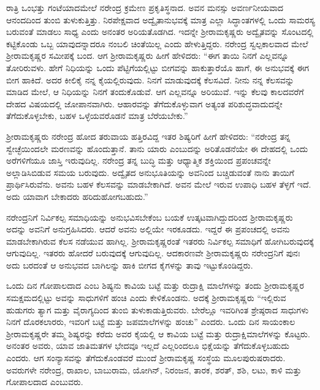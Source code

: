 ರಾತ್ರಿ ಒಂಭತ್ತು ಗಂಟೆಯಾದಮೇಲೆ ನರೇಂದ್ರ ಕ್ರಮೇಣ ಪ್ರಕೃತಿಸ್ಥನಾದ. ಅವನ ಮನಸ್ಸು ಅವರ್ಣನೀಯವಾದ ಆನಂದದಿಂದ ತುಂಬಿ ತುಳುಕುತ್ತಿತ್ತು. ನಿರಪೇಕ್ಷವಾದ ಅದ್ವೈತಾನುಭವಕ್ಕೆ ಮಾತ್ರ ಎಲ್ಲಾ ಸಿದ್ಧಾಂತಗಳಲ್ಲಿ ಒಂದು ಸಾಮರಸ್ಯ ಬರುವಂತೆ ಮಾಡಲು ಸಾಧ್ಯ ಎಂದು ಅನಂತರ ಅರಿಯತೊಡಗಿದ. ಇದನ್ನೇ ಶ‍್ರೀರಾಮಕೃಷ್ಣರು ಅದ್ವೈತವನ್ನು ಸೊಂಟದಲ್ಲಿ ಕಟ್ಟಿಕೊಂಡು ಒಬ್ಬ ಯಾವುದನ್ನಾದರೂ ನಂಬಲಿ ಚಿಂತೆಯಿಲ್ಲ ಎಂದು ಹೇಳುತ್ತಿದ್ದರು. ನರೇಂದ್ರ ಸ್ವಲ್ಪಕಾಲವಾದ ಮೇಲೆ ಶ‍್ರೀರಾಮಕೃಷ್ಣರ ಸಮೀಪಕ್ಕೆ ಬಂದ. ಆಗ ಶ‍್ರೀರಾಮಕೃಷ್ಣರು ಹೀಗೆ ಹೇಳಿದರು: “ಈಗ ತಾಯಿ ನಿನಗೆ ಎಲ್ಲವನ್ನೂ ತೋರಿರುವಳು. ಹೇಗೆ ನಿಧಿಯನ್ನು ಒಂದು ಪೆಟ್ಟಿಗೆಯಲ್ಲಿಟ್ಟು ಬೀಗವನ್ನು ಹಾಕುತ್ತಾರೆಯೊ ಹಾಗೆ, ಈ ಅನುಭವಕ್ಕೆ ಈಗ ಬೀಗ ಹಾಕಿದೆ. ಅದರ ಕೀಲಿಕೈ ನನ್ನ ಕೈಯಲ್ಲಿರುವುದು. ನಿನಗೆ ಮಾಡುವುದಕ್ಕೆ ಕೆಲಸವಿದೆ. ನೀನು ನನ್ನ ಕೆಲಸವನ್ನು ಮಾಡಿದ ಮೇಲೆ, ಆ ನಿಧಿಯನ್ನು ನಿನಗೆ ತಂದುಕೊಡುವೆ. ಆಗ ಎಲ್ಲವನ್ನೂ ಅರಿಯುವೆ. ಇನ್ನು ಕೆಲವು ಕಾಲದವರೆಗೆ ದೇಹದ ವಿಷಯದಲ್ಲಿ ಜೋಪಾನವಾಗಿರು. ಆಹಾರವನ್ನು ತೆಗೆದುಕೊಳ್ಳುವಾಗ ಅತ್ಯಂತ ಪರಿಶುದ್ಧವಾದುದನ್ನೇ ತೆಗೆದುಕೊಳ್ಳಬೇಕು, ಬಹಳ ಒಳ್ಳೆಯವರೊಡನೆ ಮಾತ್ರ ಬೆರೆಯಬೇಕು.”

ಶ‍್ರೀರಾಮಕೃಷ್ಣರು ನರೇಂದ್ರ ಹೋದ ತರುವಾಯ ಹತ್ತಿರವಿದ್ದ ಇತರ ಶಿಷ್ಯರಿಗೆ ಹೀಗೆ ಹೇಳಿದರು: “ನರೇಂದ್ರ ತನ್ನ ಸ್ವೇಚ್ಛೆಯಿಂದಲೇ ಮರಣವನ್ನು ಹೊಂದುತ್ತಾನೆ. ತಾನು ಯಾರು ಎಂಬುದನ್ನು ಅರಿತೊಡನೆಯೇ ಈ ದೇಹದಲ್ಲಿ ಒಂದು ಅರೆಗಳಿಗೆಯೂ ಜಾಸ್ತಿ ಇರುವುದಿಲ್ಲ. ನರೇಂದ್ರ ತನ್ನ ಬುದ್ಧಿ ಮತ್ತು ಆಧ್ಯಾತ್ಮಿಕ ಶಕ್ತಿಯಿಂದ ಪ್ರಪಂಚವನ್ನೇ ಅಲ್ಲಾಡಿಸಿಬಿಡುವ ಸಮಯ ಬರುವುದು. ಅದ್ವೈತದ ಅನುಭೂತಿಯನ್ನು ಅವನಿಂದ ಬಚ್ಚಿಡುವಂತೆ ನಾನು ತಾಯಿಗೆ ಪ್ರಾರ್ಥಿಸಿರುವೆನು. ಅವನು ಬಹಳ ಕೆಲಸವನ್ನು ಮಾಡಬೇಕಾಗಿದೆ. ಅವನ ಮೇಲೆ ಇರುವ ಉಪಾಧಿ ಬಹಳ ತೆಳ್ಳಗೆ ಇದೆ. ಅದು ಯಾವಾಗ ಬೇಕಾದರು ಹರಿದುಹೋಗಬಹುದು.”

ನರೇಂದ್ರನಿಗೆ ನಿರ್ವಿಕಲ್ಪ ಸಮಾಧಿಯನ್ನು ಅನುಭವಿಸಬೇಕೆಂಬ ಬಯಕೆ ಉತ್ಕಟವಾಗಿದ್ದುದರಿಂದ ಶ‍್ರೀರಾಮಕೃಷ್ಣರು ಅದನ್ನು ಅವನಿಗೆ ಅನುಗ್ರಹಿಸಿದರು. ಆದರೆ ಅವನು ಅಲ್ಲಿಯೇ ಇರಕೂಡದು. ಇದ್ದರೆ ಈ ಪ್ರಪಂಚದಲ್ಲಿ ಅವನು ಮಾಡಬೇಕಾಗಿರುವ ಕೆಲಸ ನಡೆಯುವ ಹಾಗಿಲ್ಲ. ಶ‍್ರೀರಾಮಕೃಷ್ಣರಂತೆ ಇತರರು ನಿರ್ವಿಕಲ್ಪ ಸಮಾಧಿಗೆ ಹೋಗಿಬರುವುದಕ್ಕೆ ಆಗುವುದಿಲ್ಲ. ಇತರರು ಹೋದರೆ ಬರುವುದಕ್ಕೆ ಆಗುವುದಿಲ್ಲ. ಆದಕಾರಣವೇ ಶ‍್ರೀರಾಮಕೃಷ್ಣರು ನರೇಂದ್ರನಿಗೆ ಪುನಃ ಅದು ಬರದಂತೆ ಆ ಅನುಭವದ ಬಾಗಿಲನ್ನು ಹಾಕಿ ಬೀಗದ ಕೈಗಳನ್ನು ತಾವು ಇಟ್ಟುಕೊಂಡಿದ್ದರು.

ಒಂದು ದಿನ ಗೋಪಾಲದಾದ ಎಂಬ ಶಿಷ್ಯನು ಕಾವಿಯ ಬಟ್ಟೆ ಮತ್ತು ರುದ್ರಾಕ್ಷಿ ಮಾಲೆಗಳನ್ನು ತಂದು ಶ‍್ರೀರಾಮಕೃಷ್ಣರ ಸಮಕ್ಷಮದಲ್ಲಿಟ್ಟು ಅವನ್ನು ಸಾಧುಗಳಿಗೆ ಹಂಚಿ ಎಂದು ಕೇಳಿಕೊಂಡನು. ಅದಕ್ಕೆ ಶ‍್ರೀರಾಮಕೃಷ್ಣರು “ಇಲ್ಲಿರುವ ಹುಡುಗರು ತ್ಯಾಗ ಮತ್ತು ವೈರಾಗ್ಯದಿಂದ ತುಂಬಿ ತುಳುಕಾಡುತ್ತಿರುವರು. ಬೇರೆಲ್ಲೂ ಇವರಿಗಿಂತ ಶ್ರೇಷ್ಠರಾದ ಸಾಧುಗಳು ನಿನಗೆ ದೊರಕಲಾರರು, ಇವರಿಗೆ ಬಟ್ಟೆ ಮತ್ತು ಜಪಮಾಲೆಗಳನ್ನು ಹಂಚು” ಎಂದರು. ಒಂದು ದಿನ ಸಾಯಂಕಾಲ ಶ‍್ರೀರಾಮಕೃಷ್ಣರೇ ತಮ್ಮ ಶಿಷ್ಯರನ್ನು ಕರೆದು ಅವರ ಕೈಯಲ್ಲಿ ಆ ಕಾವಿಯ ಬಟ್ಟೆ ಮತ್ತು ರುದ್ರಾಕ್ಷಿಮಾಲೆಗಳನ್ನು ಕೊಟ್ಟರು. ಅನಂತರ ಅವರು, ಯಾವ ಜಾತಿಮತಗಳ ಭೇದವೂ ಇಲ್ಲದೆ ಎಲ್ಲರಿಂದಲೂ ಭಿಕ್ಷೆಯನ್ನು ತೆಗೆದುಕೊಳ್ಳಬಹುದು ಎಂದರು. ಆಗ ಸಂನ್ಯಾಸವನ್ನು ತೆಗೆದುಕೊಂಡವರೆ ಮುಂದೆ ಶ‍್ರೀರಾಮಕೃಷ್ಣ ಸಂಸ್ಥೆಯ ಮೂಲಪುರುಷರಾದರು. ಅವರುಗಳೇ ನರೇಂದ್ರ, ರಾಖಾಲ, ಬಾಬುರಾಮ, ಯೋಗಿನ್, ನಿರಂಜನ, ತಾರಕ, ಶರತ್, ಶಶಿ, ಲಟು, ಕಾಳಿ ಮತ್ತು ಗೋಪಾಲದಾದ ಎಂಬುವರು.

